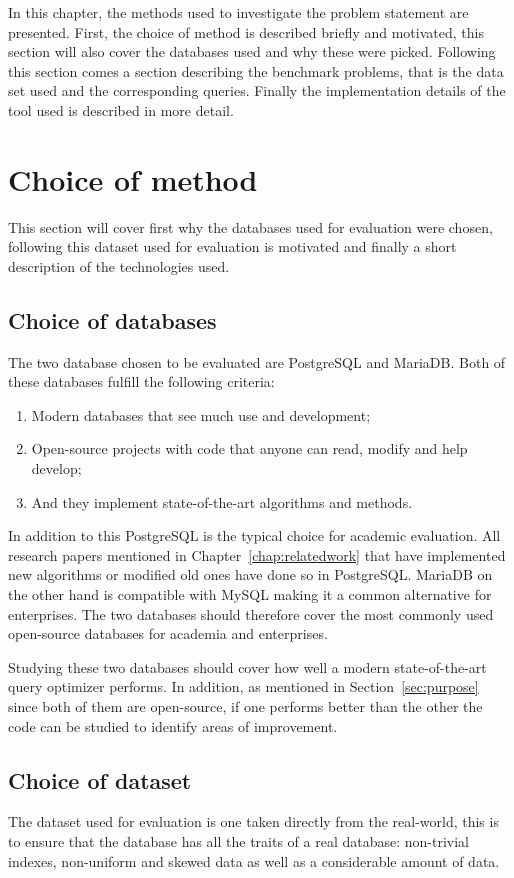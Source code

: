 In this chapter, the methods used to investigate the problem statement are
presented. First, the choice of method is described briefly and motivated, this
section will also cover the databases used and why these were picked. Following
this section comes a section describing the benchmark problems, that is the
data set used and the corresponding queries. Finally the implementation details
of the tool used is described in more detail.

\section{Choice of method}\label{sec:choiceofmethod}
This section will cover first why the databases used for evaluation were
chosen, following this dataset used for evaluation is motivated and finally a
short description of the technologies used.

\subsection{Choice of databases}\label{sec:choiceofdatabases}
The two database chosen to be evaluated are PostgreSQL and MariaDB.
Both of these databases fulfill the following criteria:
\begin{enumerate}
\item Modern databases that see much use and development;
\item Open-source projects with code that anyone can read, modify and help develop;
\item And they implement state-of-the-art algorithms and methods.
\end{enumerate}

In addition to this PostgreSQL is the typical choice for academic evaluation.
All research papers mentioned in Chapter~\ref{chap:relatedwork} that have
implemented new algorithms or modified old ones have done so in PostgreSQL.
MariaDB on the other hand is compatible with MySQL making it a common
alternative for enterprises. The two databases should therefore cover the most
commonly used open-source databases for academia and enterprises.

Studying these two databases should cover how well a modern state-of-the-art
query optimizer performs. In addition, as mentioned in Section~\ref{sec:purpose}
since both of them are open-source, if one performs better than the other the
code can be studied to identify areas of improvement.

\subsection{Choice of dataset}
The dataset used for evaluation is one taken directly from the real-world, this
is to ensure that the database has all the traits of a real database:
non-trivial indexes, non-uniform and skewed data as well as a considerable
amount of data.

